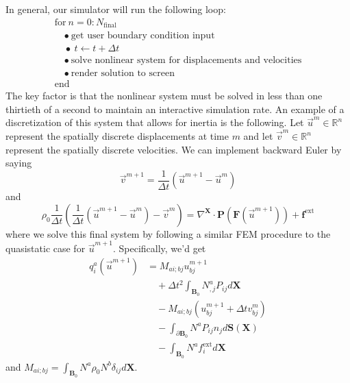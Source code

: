 In general, our simulator will run the following loop:
\begin{equation}
\begin{array}{lc}
\text{for} \ n = 0 : N_\text{final} \\
\quad \bullet \ \text{get user boundary condition input} \\
\quad \bullet \ t \leftarrow t + \Delta{t} \\
\quad \bullet \ \text{solve nonlinear system for displacements and velocities} \\
\quad \bullet \ \text{render solution to screen}\\
\text{end}
\end{array}
\end{equation}
The key factor is that the nonlinear system must be solved in less than one thirtieth of a second to maintain an interactive simulation rate. An example of a discretization of this system that allows for inertia is the following. Let $\vec{u}^m \in \mathbb{R}^n$ represent the spatially discrete displacements at time $m$ and let $\vec{v}^m \in \mathbb{R}^n$ represent the spatially discrete velocities. We can implement backward Euler by saying
\begin{equation*}
\vec{v}^{m+1} = \frac{1}{\Delta t} \left( \vec{u}^{m+1} - \vec{u}^m \right)
\end{equation*}
and
\begin{equation*}
\rho_0 \frac{1}{\Delta t} \left( \frac{1}{\Delta t} \left( \vec{u}^{m+1} - \vec{u}^m \right) - \vec{v}^m \right) = \nabla^{\mathbf{X}} \cdot \mathbf{P} \left( \mathbf{F} \left( \vec{u}^{m+1} \right) \right) + \mathbf{f}^{\text{ext}}
\end{equation*}
where we solve this final system by following a similar FEM procedure to the quasistatic case for $\vec{u}^{m+1}$. Specifically, we'd get
\begin{align*}
q^a_i \left( \vec{u}^{m+1} \right)
& = M_{ai;bj} u^{m+1}_{bj} \\
& \quad {} + \Delta t^2 \int_{\mathbf{B}_0} N^a_{,j} P_{ij} d\mathbf{X} \\
& \quad {} - M_{ai;bj} \left( u^{m+1}_{bj} + \Delta{t} v^m_{bj} \right) \\
& \quad {} - \int_{\partial\mathbf{B}_0} N^a P_{ij} n_j d\mathbf{S}(\mathbf{X}) \\
& \quad {} - \int_{\mathbf{B}_0} N^a f^{\text{ext}}_i d\mathbf{X}
\end{align*}
and $M_{ai;bj}=\int_{\mathbf{B}_0} N^a \rho_0 N^b \delta_{ij} d\mathbf{X}$.
